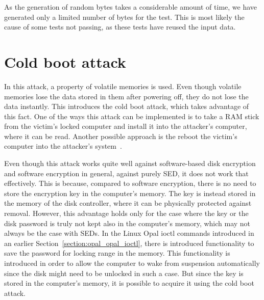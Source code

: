 As the generation of random bytes takes a considerable amount of time, we have generated only a limited number of bytes for the test. This is most likely the cause of some tests not passing, as these tests have reused the input data.



\section{Cold boot attack}
\label{cold_boot_attack}

In this attack, a property of volatile memories is used. Even though volatile memories lose the data stored in them after powering off, they do not lose the data instantly. This introduces the cold boot attack, which takes advantage of this fact. One of the ways this attack can be implemented is to take a RAM stick from the victim's locked computer and install it into the attacker's computer, where it can be read. Another possible approach is the reboot the victim's computer into the attacker's system~\cite{self_decrypting_risks}.

\REPLACEME

Even though this attack works quite well against software-based disk encryption and software encryption in general, against purely SED, it does not work that effectively. This is because, compared to software encryption, there is no need to store the encryption key in the computer's memory. The key is instead stored in the memory of the disk controller, where it can be physically protected against removal.
However, this advantage holds only for the case where the key or the disk password is truly not kept also in the computer's memory, which may not always be the case with SEDs. In the Linux Opal ioctl commands introduced in an earlier Section~\ref{section:opal_opal_ioctl}, there is introduced functionality to save the password for locking range in the memory. This functionality is introduced in order to allow the computer to wake from suspension automatically since the disk might need to be unlocked in such a case. But since the key is stored in the computer's memory, it is possible to acquire it using the cold boot attack.


